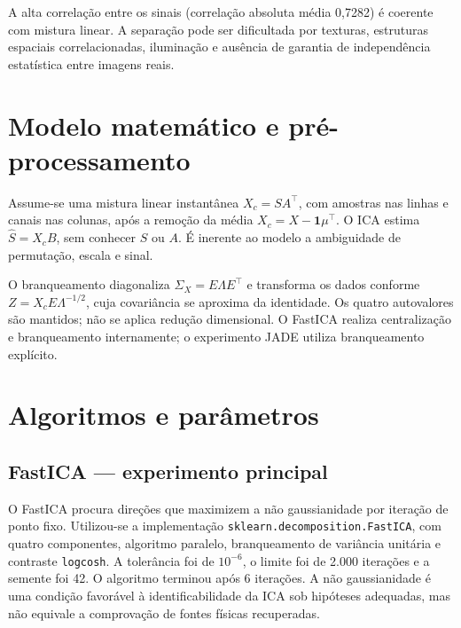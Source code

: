\documentclass[12pt,a4paper]{article}
\begin{document}
A alta correlação entre os sinais (correlação absoluta média 0,7282) é coerente com mistura linear. A separação pode ser dificultada por texturas, estruturas espaciais correlacionadas, iluminação e ausência de garantia de independência estatística entre imagens reais.

\section{Modelo matemático e pré-processamento}
Assume-se uma mistura linear instantânea \(X_c=SA^\top\), com amostras nas linhas e canais nas colunas, após a remoção da média \(X_c=X-\boldsymbol{1}\mu^\top\). O ICA estima \(\widehat S=X_cB\), sem conhecer \(S\) ou \(A\). É inerente ao modelo a ambiguidade de permutação, escala e sinal.

O branqueamento diagonaliza \(\Sigma_X=E\Lambda E^\top\) e transforma os dados conforme \(Z=X_cE\Lambda^{-1/2}\), cuja covariância se aproxima da identidade. Os quatro autovalores são mantidos; não se aplica redução dimensional. O FastICA realiza centralização e branqueamento internamente; o experimento JADE utiliza branqueamento explícito.

\section{Algoritmos e parâmetros}
\subsection{FastICA — experimento principal}
O FastICA procura direções que maximizem a não gaussianidade por iteração de ponto fixo. Utilizou-se a implementação \texttt{sklearn.decomposition.FastICA}, com quatro componentes, algoritmo paralelo, branqueamento de variância unitária e contraste \texttt{logcosh}. A tolerância foi de \(10^{-6}\), o limite foi de 2.000 iterações e a semente foi 42. O algoritmo terminou após 6 iterações. A não gaussianidade é uma condição favorável à identificabilidade da ICA sob hipóteses adequadas, mas não equivale a comprovação de fontes físicas recuperadas.
\end{document}
